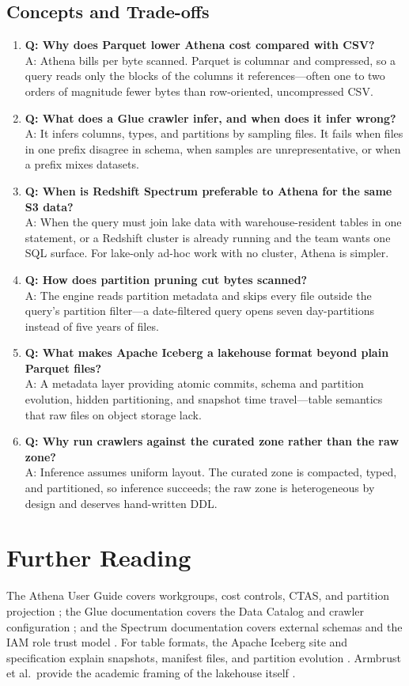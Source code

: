 \subsection{Concepts and Trade-offs}
\begin{enumerate}
    \item \textbf{Q: Why does Parquet lower Athena cost compared with CSV?}\\
    A: Athena bills per byte scanned. Parquet is columnar and compressed, so a query reads only the blocks of the columns it references---often one to two orders of magnitude fewer bytes than row-oriented, uncompressed CSV.
    \item \textbf{Q: What does a Glue crawler infer, and when does it infer wrong?}\\
    A: It infers columns, types, and partitions by sampling files. It fails when files in one prefix disagree in schema, when samples are unrepresentative, or when a prefix mixes datasets.
    \item \textbf{Q: When is Redshift Spectrum preferable to Athena for the same S3 data?}\\
    A: When the query must join lake data with warehouse-resident tables in one statement, or a Redshift cluster is already running and the team wants one SQL surface. For lake-only ad-hoc work with no cluster, Athena is simpler.
    \item \textbf{Q: How does partition pruning cut bytes scanned?}\\
    A: The engine reads partition metadata and skips every file outside the query's partition filter---a date-filtered query opens seven day-partitions instead of five years of files.
    \item \textbf{Q: What makes Apache Iceberg a lakehouse format beyond plain Parquet files?}\\
    A: A metadata layer providing atomic commits, schema and partition evolution, hidden partitioning, and snapshot time travel---table semantics that raw files on object storage lack.
    \item \textbf{Q: Why run crawlers against the curated zone rather than the raw zone?}\\
    A: Inference assumes uniform layout. The curated zone is compacted, typed, and partitioned, so inference succeeds; the raw zone is heterogeneous by design and deserves hand-written DDL.
\end{enumerate}

\section{Further Reading}
The Athena User Guide covers workgroups, cost controls, CTAS, and partition projection \cite{awsAthenaDocs}; the Glue documentation covers the Data Catalog and crawler configuration \cite{awsGlueCatalogDocs}; and the Spectrum documentation covers external schemas and the IAM role trust model \cite{awsRedshiftSpectrumDocs}. For table formats, the Apache Iceberg site and specification explain snapshots, manifest files, and partition evolution \cite{apacheIceberg}. Armbrust et al.\ provide the academic framing of the lakehouse itself \cite{armbrust2021lakehouse}.

